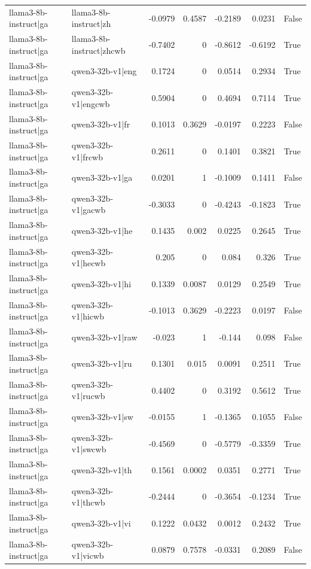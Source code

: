 \begin{table}
\begin{tabular}{l l r r r r l}
llama3-8b-instruct|ga & llama3-8b-instruct|zh & -0.0979 & 0.4587 & -0.2189 & 0.0231 & False \\
llama3-8b-instruct|ga & llama3-8b-instruct|zhcwb & -0.7402 & 0 & -0.8612 & -0.6192 & True \\
llama3-8b-instruct|ga & qwen3-32b-v1|eng & 0.1724 & 0 & 0.0514 & 0.2934 & True \\
llama3-8b-instruct|ga & qwen3-32b-v1|engcwb & 0.5904 & 0 & 0.4694 & 0.7114 & True \\
llama3-8b-instruct|ga & qwen3-32b-v1|fr & 0.1013 & 0.3629 & -0.0197 & 0.2223 & False \\
llama3-8b-instruct|ga & qwen3-32b-v1|frcwb & 0.2611 & 0 & 0.1401 & 0.3821 & True \\
llama3-8b-instruct|ga & qwen3-32b-v1|ga & 0.0201 & 1 & -0.1009 & 0.1411 & False \\
llama3-8b-instruct|ga & qwen3-32b-v1|gacwb & -0.3033 & 0 & -0.4243 & -0.1823 & True \\
llama3-8b-instruct|ga & qwen3-32b-v1|he & 0.1435 & 0.002 & 0.0225 & 0.2645 & True \\
llama3-8b-instruct|ga & qwen3-32b-v1|hecwb & 0.205 & 0 & 0.084 & 0.326 & True \\
llama3-8b-instruct|ga & qwen3-32b-v1|hi & 0.1339 & 0.0087 & 0.0129 & 0.2549 & True \\
llama3-8b-instruct|ga & qwen3-32b-v1|hicwb & -0.1013 & 0.3629 & -0.2223 & 0.0197 & False \\
llama3-8b-instruct|ga & qwen3-32b-v1|raw & -0.023 & 1 & -0.144 & 0.098 & False \\
llama3-8b-instruct|ga & qwen3-32b-v1|ru & 0.1301 & 0.015 & 0.0091 & 0.2511 & True \\
llama3-8b-instruct|ga & qwen3-32b-v1|rucwb & 0.4402 & 0 & 0.3192 & 0.5612 & True \\
llama3-8b-instruct|ga & qwen3-32b-v1|sw & -0.0155 & 1 & -0.1365 & 0.1055 & False \\
llama3-8b-instruct|ga & qwen3-32b-v1|swcwb & -0.4569 & 0 & -0.5779 & -0.3359 & True \\
llama3-8b-instruct|ga & qwen3-32b-v1|th & 0.1561 & 0.0002 & 0.0351 & 0.2771 & True \\
llama3-8b-instruct|ga & qwen3-32b-v1|thcwb & -0.2444 & 0 & -0.3654 & -0.1234 & True \\
llama3-8b-instruct|ga & qwen3-32b-v1|vi & 0.1222 & 0.0432 & 0.0012 & 0.2432 & True \\
llama3-8b-instruct|ga & qwen3-32b-v1|vicwb & 0.0879 & 0.7578 & -0.0331 & 0.2089 & False \\

\end{tabular}
\end{table}
